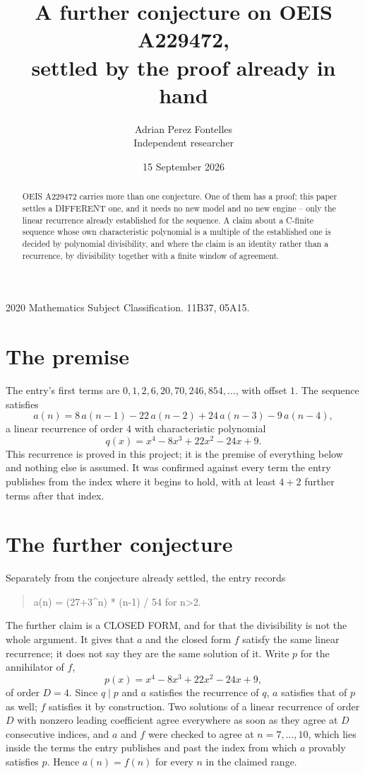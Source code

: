 \documentclass[11pt,a4paper]{article}
\title{A further conjecture on OEIS A229472,\\ \large settled by the proof already in hand}
\author{Adrian Perez Fontelles\\ \small Independent researcher}
\date{15 September 2026}
\theoremstyle{plain}
\theoremstyle{definition}
\begin{document}
\maketitle

\begin{abstract}
OEIS A229472 carries more than one conjecture. One of them has a proof; this paper settles a
DIFFERENT one, and it needs no new model and no new engine -- only the linear recurrence already
established for the sequence. A claim about a C-finite sequence whose own characteristic
polynomial is a multiple of the established one is decided by polynomial divisibility, and where
the claim is an identity rather than a recurrence, by divisibility together with a finite window
of agreement.
\end{abstract}

\noindent\small 2020 Mathematics Subject Classification. 11B37, 05A15.\normalsize

\section{The premise}

The entry's first terms are $0, 1, 2, 6, 20, 70, 246, 854,\dots$, with offset $1$. The sequence satisfies
\[
  a(n)=8\,a(n-1) - 22\,a(n-2) + 24\,a(n-3) - 9\,a(n-4) ,
\]
a linear recurrence of order $4$ with characteristic polynomial
\[
  q(x)=x^{4} - 8 x^{3} + 22 x^{2} - 24 x + 9 .
\]
This recurrence is proved in this project; it is the premise of everything below and nothing else is assumed.
It was confirmed against every term the entry publishes from the index where it begins to hold,
with at least $4+2$ further terms after that index.

\section{The further conjecture}

Separately from the conjecture already settled, the entry records

\begin{quote}\raggedright a(n) = (27+3\^{}n) * (n-1) / 54 for n>2.\end{quote}

The further claim is a CLOSED FORM, and for that the divisibility is not the whole argument. It
gives that $a$ and the closed form $f$ satisfy the same linear recurrence; it does not say they
are the same solution of it. Write $p$ for the annihilator of $f$,
\[
  p(x)=x^{4} - 8 x^{3} + 22 x^{2} - 24 x + 9 ,
\]
of order $D=4$. Since $q\mid p$ and $a$ satisfies the recurrence of $q$, $a$ satisfies that of
$p$ as well; $f$ satisfies it by construction. Two solutions of a linear recurrence of order $D$
with nonzero leading coefficient agree everywhere as soon as they agree at $D$ consecutive
indices, and $a$ and $f$ were checked to agree at $n=7,\dots,10$,
which lies inside the terms the entry publishes and past the index from which $a$ provably
satisfies $p$. Hence $a(n)=f(n)$ for every $n$ in the claimed range.
\end{document}
